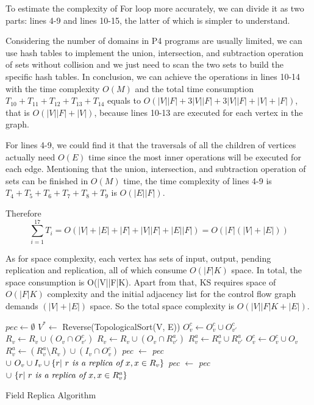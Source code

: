 \documentclass[sigconf, 10pt]{acmart}
\theoremstyle{plain}
\begin{document}
To estimate the complexity of For loop more accurately, we can divide it as two parts: lines 4-9 and lines 10-15, the latter of which is simpler to understand.

Considering the number of domains in P4 programs are usually limited, we can use hash tables to implement the union, intersection, and subtraction operation of sets without collision and we just need to scan the two sets to build the specific hash tables. In conclusion, we can achieve the operations in lines 10-14 with the time complexity $O(M)$ and the total time consumption $T_{10} + T_{11} + T_{12} + T_{13} + T_{14}$ equals to $O( |V||F| + 3|V||F| + 3|V||F| + |V|+|F|)$, that is $O(|V||F| + |V|)$, because lines 10-13 are executed for each vertex in the graph.


For lines 4-9, we could find it that the traversals of all the children of vertices actually need $O(E)$ time since the most inner operations will be executed for each edge. Mentioning that the union, intersection, and subtraction operation of sets can be finished in $O(M)$ time, the time complexity of lines 4-9 is $T_{4} + T_{5} + T_{6} + T_{7} + T_{8} + T_{9}$ is $O(|E||F|)$.

Therefore 
\begin{displaymath}
\sum_{i=1}^{17}T_{i}= O(|V|+|E|+|F|+|V||F|+|E||F|) =O(|F|(|V|+|E|))
\end{displaymath}


As for space complexity, each vertex has sets of input, output, pending replication and replication, all of which consume $O(|F|K)$ space. In total, the space consumption is O(|V||F|K). Apart from that, KS requires space of $O(|F|K)$ complexity and the initial adjacency list for the control flow graph demands $(|V|+|E|)$ space. So the total space complexity is $O(|V||F|K+|E|)$.

\begin{algorithm}[!t]
\LinesNumbered
{}
$pec \leftarrow \emptyset$ \;
$ V^{*} \leftarrow $ Reverse(TopologicalSort(V, E)) \;
 {
     {
    	$O^c_v \leftarrow O^c_v \cup O^c_{v'}$ \;
    	$ R_v \leftarrow R_v \cup ( O_v \cap O^c_{v'} ) $ \;
    	$ R_v \leftarrow R_v \cup ( O_v \cap R_{v'}^a )$ \;
        $ R^a_v \leftarrow R^a_v \cup R^a_{v'}  $ \;
    }    
	$O^c_v \leftarrow O^c_v \cup O_v $ \;
    $R^a_v \leftarrow (R^a_v \setminus R_v) \cup (I_v \cap O^c_v) $ \;
    \textit{pec} $\leftarrow$ \textit{pec} $ \cup \ O_v \cup I_v \cup \{r|\ \text{\textit{$r$ is a replica of $x$}}, x \in R_v\} $\;
     {
    	\textit{pec} $\leftarrow$ \textit{pec} $ \cup \ \{r|\ \text{\textit{$r$ is a replica of $x$}}, x \in R^a_v\}  $\;
    }
}
\;
\caption{Field Replica Algorithm}
\label{alg:field-replica}
\end{algorithm}
\end{document}
